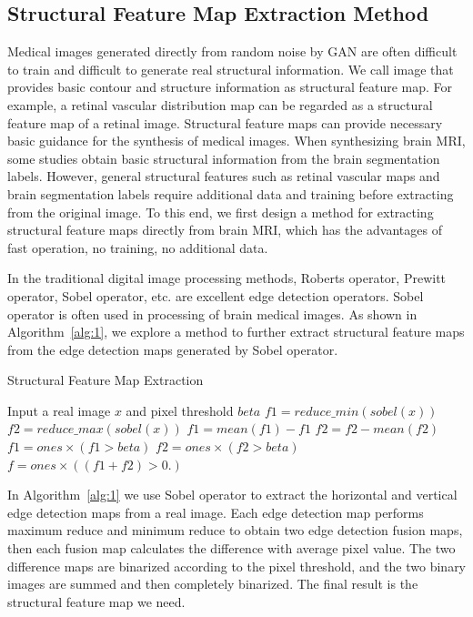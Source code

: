 \documentclass[letterpaper]{article} %
\begin{document}
\subsection{Structural Feature Map Extraction Method}
Medical images generated directly from random noise by GAN are often difficult to train and difficult to generate real structural information. We call image that provides basic contour and structure information as structural feature map. For example, a retinal vascular distribution map can be regarded as a structural feature map of a retinal image\cite{41costa2017towards}. Structural feature maps can provide necessary basic guidance for the synthesis of medical images. When synthesizing brain MRI, some studies obtain basic structural information from the brain segmentation labels\cite{4shin2018medical}. However, general structural features such as retinal vascular maps and brain segmentation labels require additional data and training before extracting from the original image. To this end, we first design a method for extracting structural feature maps directly from brain MRI, which has the advantages of fast operation, no training, no additional data.

In the traditional digital image processing methods, Roberts operator, Prewitt operator, Sobel operator, etc. are excellent edge detection operators. Sobel operator is often used in processing of brain medical images. As shown in Algorithm~\ref{alg:1}, we explore a method to further extract structural feature maps from the edge detection maps generated by Sobel operator.
\begin{algorithm}
	\caption{Structural Feature Map Extraction}
	\label{alg:1}
	\begin{algorithmic}[1]
		\State Input a real image $x$ and pixel threshold $beta$
		\State $f1 = reduce\_min(sobel(x))$
		\State $f2 = reduce\_max(sobel(x))$
		\State $f1 = mean(f1) - f1$
		\State $f2 = f2 - mean(f2)$
		\State $f1 = ones \times (f1 > beta)$
		\State $f2 = ones \times (f2 > beta)$
		\State $f = ones \times ((f1 + f2)> 0.)$
	\end{algorithmic}  
\end{algorithm}

In Algorithm~\ref{alg:1} we use Sobel operator to extract the horizontal and vertical edge detection maps from a real image. Each edge detection map performs maximum reduce and minimum reduce to obtain two edge detection fusion maps, then each fusion map calculates the difference with average pixel value. The two difference maps are binarized according to the pixel threshold, and the two binary images are summed and then completely binarized. The final result is the structural feature map we need.
\end{document}
